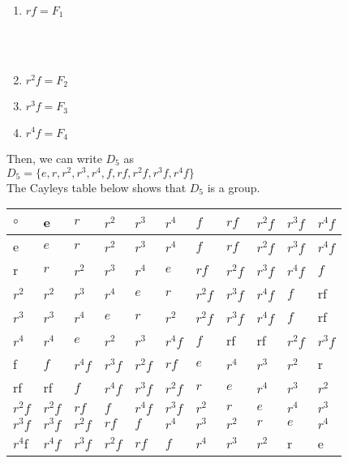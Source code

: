 \documentclass{article}
\begin{document}
\vspace{8cm}
\begin{enumerate}
    \item $rf={F_1}$

\\\\

\item  $r^2f={F_2}$


\item  $r^3f={F_3}$



\item $r^4f={F_4}$

\end{enumerate}

Then, we can write $D_5$ as \\
$D_5=\{e,r,r^2,r^3,r^4,f,rf,r^2f,r^3f,r^4f\}$\\

The Cayleys table below shows that $D_5$ is a group.\\
\begin{tabular}{| l | l | l | l |l |l |l |l |l |l |l |}
\hline
$\circ$ & e &$ r $&$ r^2 $&$ r^3 $&$ r^4 $&$ f $&$ rf $&$ r^2f $&$ r^3f $&$ r^4f$ \\
\hline
e &$ e $&$ r $&$ r^2 $&$ r^3 $&$ r^4 $&$ f $&$ rf $&$ r^2f $&$ r^3f $&$ r^4f$ \\
\hline
r &$ r $&$ r^2 $&$ r^3 $&$ r^4 $&$ e $&$ rf $&$ r^2f $&$ r^3f $&$ r^4f $&$ f$ \\
\hline
$r^2$&$ r^2 $&$ r^3 $&$ r^4 $&$ e $&$ r $&$ r^2f $&$ r^3f $&$ r^4f $&$ f $& rf\\
\hline
$r^3$&$ r^3 $&$ r^4 $&$ e $&$ r $&$r^2$&$ r^2f $&$ r^3f $&$ r^4f $&$ f $& rf\\
\hline
$r^4$ &$ r^4 $&$ e $&$ r^2 $&$ r^3  $&$ r^4f $&$ f $& rf& rf &$ r^2f $&$ r^3f$\\
\hline
f &$ f $&$ r^4f $&$ r^3f $&$ r^2f  $&$ rf $&$ e $&$ r^4$&$ r^3 $&$ r^2 $& r\\
\hline
rf& rf &$ f $&$ r^4f $&$ r^3f $&$ r^2f $&$ r  $&$ e $&$ r^4 $&$ r^3 $&$  r^2$ \\
\hline
$r^2f$&$ r^2f $&$ rf $&$ f $&$ r^4f $&$ r^3f $&$ r^2 $&$ r  $&$ e $&$ r^4 $&$ r^3$
\\\hline
$r^3f$& $r^3f $&$r^2f $&$ rf $&$ f $&$ r^4 $&$ r^3 $&$ r^2 $&$ r  $&$ e $&$ r^4$ \\
\hline
$r^4$f& $r^4f$& $r^3f$&$r^2f $&$ rf $&$ f $&$ r^4 $&$ r^3 $&$ r^2 $&r &e\\
\hline
\end{tabular}
\\
\end{document}
